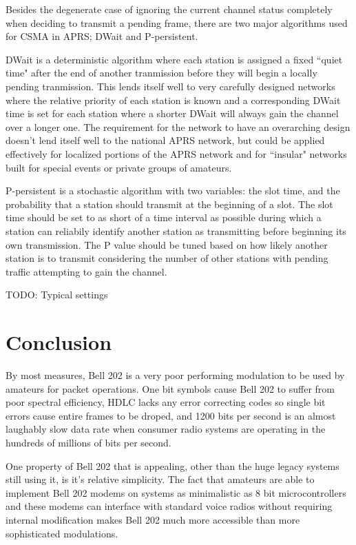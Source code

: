 \documentclass[12pt,letterpaper]{article}
\begin{document}
Besides the degenerate case of ignoring the current channel status completely when 
deciding to transmit a pending frame, there are two major algorithms used for CSMA
in APRS;
DWait and P-persistent.

DWait is a deterministic algorithm where each station is assigned a fixed
``quiet time" after the end of another tranmission before they will begin a locally
pending tranmission. This lends itself well to very carefully designed networks
where the relative priority of each station is known and a corresponding DWait time
is set for each station where a shorter DWait will always gain the channel over a longer
one. The requirement for the network to have an overarching design doesn't lend itself
well to the national APRS network, but could be applied effectively for localized 
portions of the APRS network and for ``insular" networks built for special events or
private groups of amateurs.

P-persistent is a stochastic algorithm with two variables: the slot time, and the
probability that a station should transmit at the beginning of a slot. The slot time
should be set to as short of a time interval as possible during which a station can
reliabily identify another station as transmitting 
before beginning its own transmission.
The P value should be tuned based on how likely another station is to transmit 
considering the number of other stations with 
pending traffic attempting to gain the channel.

TODO: Typical settings

\section{Conclusion}


By most measures, Bell 202 is a very poor performing modulation to
be used by amateurs for packet operations. 
One bit symbols cause Bell 202 to suffer from poor spectral efficiency,
HDLC lacks any error correcting codes so single bit errors cause entire 
frames to be droped, and 1200 bits per second is an almost laughably slow
data rate when consumer radio systems are operating in the hundreds of millions
of bits per second.

One property of Bell 202 that is appealing, other than the 
huge legacy systems still using it, is it's relative simplicity.
The fact that amateurs are able to implement Bell 202 modems on
systems as minimalistic as 8 bit microcontrollers and these modems can 
interface with standard voice radios without requiring internal modification 
makes Bell 202 much more accessible than more sophisticated modulations.
\end{document}
